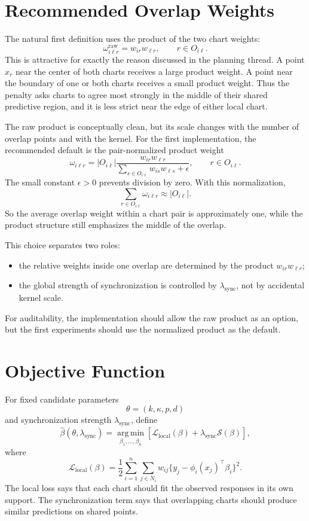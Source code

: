 \documentclass[11pt]{article}
\newcommand{\argmin}{\operatorname*{arg\,min}}
\begin{document}
\section{Recommended Overlap Weights}

The natural first definition uses the product of the two chart weights:
\[
  \omega_{i\ell r}^{\mathrm{raw}}
  =
  w_{ir}w_{\ell r},
  \qquad r\in O_{i\ell}.
\]
This is attractive for exactly the reason discussed in the planning thread.  A
point \(x_r\) near the center of both charts receives a large product weight.
A point near the boundary of one or both charts receives a small product
weight.  Thus the penalty asks charts to agree most strongly in the middle of
their shared predictive region, and it is less strict near the edge of either
local chart.

The raw product is conceptually clean, but its scale changes with the number of
overlap points and with the kernel.  For the first implementation, the
recommended default is the pair-normalized product weight
\[
  \omega_{i\ell r}
  =
  |O_{i\ell}|
  \frac{
    w_{ir}w_{\ell r}
  }{
    \sum_{s\in O_{i\ell}} w_{is}w_{\ell s}+\epsilon
  },
  \qquad r\in O_{i\ell}.
\]
The small constant \(\epsilon>0\) prevents division by zero.  With this
normalization,
\[
  \sum_{r\in O_{i\ell}}\omega_{i\ell r}
  \approx |O_{i\ell}|.
\]
So the average overlap weight within a chart pair is approximately one, while
the product structure still emphasizes the middle of the overlap.

This choice separates two roles:
\begin{itemize}[leftmargin=*]
  \item the relative weights inside one overlap are determined by the product
    \(w_{ir}w_{\ell r}\);
  \item the global strength of synchronization is controlled by
    \(\lambda_{\mathrm{sync}}\), not by accidental kernel scale.
\end{itemize}
For auditability, the implementation should allow the raw product as an option,
but the first experiments should use the normalized product as the default.

\section{Objective Function}

For fixed candidate parameters
\[
  \theta=(k,\kappa,p,d)
\]
and synchronization strength \(\lambda_{\mathrm{sync}}\), define
\[
  \widehat\beta(\theta,\lambda_{\mathrm{sync}})
  =
  \argmin_{\beta_1,\ldots,\beta_n}
  \left[
    \mathcal L_{\mathrm{local}}(\beta)
    +
    \lambda_{\mathrm{sync}}\mathcal S(\beta)
  \right],
\]
where
\[
  \mathcal L_{\mathrm{local}}(\beta)
  =
  \frac12
  \sum_{i=1}^{n}
  \sum_{j\in N_i}
  w_{ij}
  \{y_j-\phi_i(x_j)^\top\beta_i\}^2.
\]
The local loss says that each chart should fit the observed responses in its
own support.  The synchronization term says that overlapping charts should
produce similar predictions on shared points.
\end{document}
